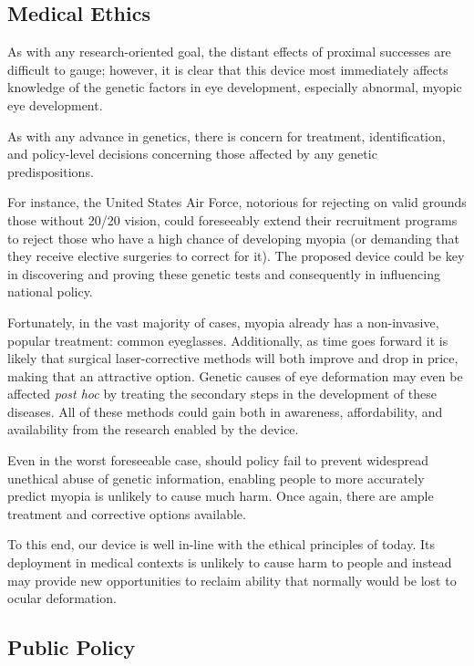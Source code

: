 \documentclass{article}
\begin{document}
 
\subsection{Medical Ethics}
\label{sec:blah-blah-blah}
 
As with any research-oriented goal, the distant effects of proximal
successes are difficult to gauge; however, it is clear that this device most
immediately affects knowledge of the genetic factors in eye
development, especially abnormal, myopic eye development. 


As with any advance in
genetics, there is concern for treatment, identification, and
policy-level decisions concerning those affected by any genetic
predispositions.
 
For instance, the United States Air Force, notorious for
rejecting on valid grounds those without 20/20 vision, could foreseeably extend
their recruitment programs to reject those who have a high chance of
developing myopia (or demanding that they receive elective surgeries
to correct for it). The proposed device could be key in discovering and proving these genetic tests and consequently in influencing national policy. 
 
Fortunately, in the vast majority of cases, myopia already has a non-invasive, popular
treatment: common eyeglasses. Additionally, as time goes forward it is
likely that surgical laser-corrective methods will both improve
and drop in price, making that an attractive option. Genetic
causes of eye deformation may even be affected \textit{post hoc} by
treating the secondary steps in the development of these diseases. All
of these methods could gain both in awareness, affordability, and
availability from the research enabled by the device.
 
Even in the worst foreseeable case, should policy fail to prevent
widespread unethical abuse of genetic information, enabling people to
more accurately predict myopia is unlikely to cause much harm. Once
again, there are ample treatment and corrective options available.
 
To this end, our device is well in-line with the ethical
principles of today. Its deployment in medical contexts is unlikely
to cause harm to people and instead may provide new opportunities to
reclaim ability that normally would be lost to ocular deformation.
 
 
 
\subsection{Public Policy}
\label{sec:Public Policy}
 
\end{document}
